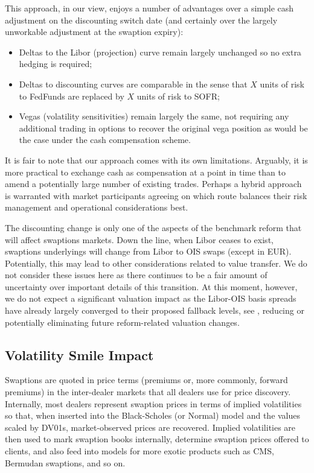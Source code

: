 \documentclass{article}
\begin{document}
This approach, in our view, enjoys a number of advantages over a simple cash
adjustment on the discounting switch date (and certainly over the largely
unworkable adjustment at the swaption expiry):

\begin{itemize}
\item Deltas to the Libor (projection) curve remain largely unchanged so no
extra hedging is required;

\item Deltas to discounting curves are comparable in the sense that $X$
units of risk to FedFunds are replaced by $X$ units of risk to SOFR;

\item Vegas (volatility sensitivities) remain largely the same, not
requiring any additional trading in options to recover the original vega
position as would be the case under the cash compensation scheme.
\end{itemize}

It is fair to note that our approach comes with its own limitations.
Arguably, it is more practical to exchange cash as compensation at a point
in time than to amend a potentially large number of existing trades. Perhaps
a hybrid approach is warranted with market participants agreeing on which
route balances their risk management and operational considerations best.

The discounting change is only one of the aspects of the benchmark reform
that will affect swaptions markets. Down the line, when Libor ceases to
exist, swaptions underlyings will change from Libor to OIS swaps (except in
EUR). Potentially, this may lead to other considerations related to value
transfer. We do not consider these issues here as there continues to be a
fair amount of uncertainty over important details of this transition. At
this moment, however, we do not expect a significant valuation impact as the
Libor-OIS basis spreads have already largely converged to their proposed
fallback levels, see \cite{henrard-ssrn1}, reducing or potentially
eliminating future reform-related valuation changes.

\subsection{Volatility Smile Impact\label{sec:swpt_vols}}

Swaptions are quoted in price terms (premiums or, more commonly, forward
premiums) in the inter-dealer markets that all dealers use for price
discovery. Internally, most dealers represent swaption prices in terms of
implied volatilities so that, when inserted into the Black-Scholes (or
Normal) model and the values scaled by DV01s, market-observed prices are
recovered. Implied volatilities are then used to mark swaption books
internally, determine swaption prices offered to clients, and also feed into
models for more exotic products such as CMS, Bermudan swaptions, and so on.
\end{document}
